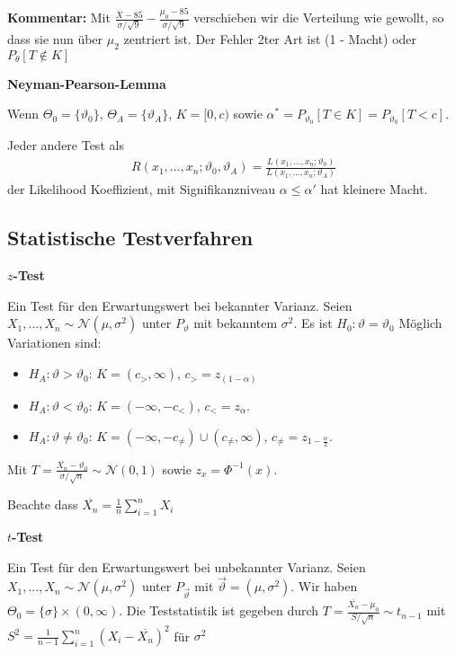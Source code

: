 \documentclass[25pt]{sciposter}
\newenvironment{method}[1]{\begin{mdframed}[backgroundcolor=blue!10,innertopmargin=15pt, innerbottommargin=15pt,nobreak=true]
		\textbf{#1 }
	}
	{ 
	\end{mdframed}
}
\newenvironment{thm}[1]{\begin{mdframed}[backgroundcolor=pink!20,innertopmargin=15pt, innerbottommargin=15pt, nobreak=true]
		\textbf{#1 }
	}
	{ 
	\end{mdframed}
}
\begin{document}
\begin{multicols}{3}
		\textbf{Kommentar: } Mit $\frac{\overline{X} -85}{\sigma / \sqrt{9}} - \frac{\mu_0  -85}{\sigma / \sqrt{9}}$ verschieben wir die Verteilung wie gewollt, so dass sie nun über $\mu_2$ zentriert ist. Der Fehler 2ter Art ist (1 - Macht) oder $P_\theta [T\not \in K]$
		
		\begin{thm}{Neyman-Pearson-Lemma}
			Wenn $\Theta_0 = \{\vartheta_0\}$, $\Theta_A = \{\vartheta_A\}$, $K = [0,c)$ sowie $\alpha^*= P_{\vartheta_0}[T\in K] = P_{\vartheta_0}[T < c]$.
			
			Jeder andere Test als 
			\begin{align*}
				R(x_1,\ldots,x_n;\vartheta_0, \vartheta_A) = \frac{L(x_1,\ldots,x_n;\vartheta_0)}{L(x_1,\ldots,x_n;\vartheta_A)}
			\end{align*}der Likelihood Koeffizient, mit Signifikanzniveau $\alpha \leq \alpha'$ hat kleinere Macht.
		\end{thm}
		
		
		\subsection*{Statistische Testverfahren}
		
		
		\begin{method}{$z$-Test}
			Ein Test für den Erwartungswert bei bekannter Varianz. Seien $X_1,\ldots,X_n\sim \mathcal{N}(\mu,\sigma^2)$ unter $P_{\vartheta}$ mit bekanntem $\sigma^2$. Es ist $H_0 : \vartheta = \vartheta_0$ Möglich Variationen sind:
			\begin{itemize}
				\item $H_A: \vartheta > \vartheta_0$: $K = (c_>,\infty)$, $c_> = z_{(1-\alpha)}$
				\item $H_A: \vartheta < \vartheta_0$: $K = (-\infty,-c_<)$, $c_< = z_\alpha$.
				\item $H_A: \vartheta \neq \vartheta_0$: $K = (-\infty,-c_{\neq}) \cup (c_{\neq},\infty)$, $c_{\neq} = z_{1-\frac{\alpha}{2}}$.
			\end{itemize}
			Mit $T=\frac{\overline{X_n}-\vartheta_0}{\sigma / \sqrt{n}} \sim \mathcal{N}(0,1)$ sowie $z_{x} = \Phi^{-1}(x)$.
		\end{method}
		Beachte dass $\overline{X_n} = \frac{1}{n} \sum_{i=1}^{n} X_i$
		
		\begin{method}{$t$-Test}
			Ein Test für den Erwartungswert bei unbekannter Varianz. Seien $X_1,\ldots,X_n\sim \mathcal{N}(\mu,\sigma^2)$ unter $P_{\vec{\vartheta}}$ mit $\vec{\vartheta}=(\mu,\sigma^2)$. Wir haben $\Theta_0= \{\sigma\}\times(0,\infty)$. Die Teststatistik ist gegeben durch $T = \frac{\overline{X_n}- \mu_0}{S/\sqrt{n}} \sim t_{n-1}$ mit $S^2=\frac{1}{n-1}\sum_{i=1}^{n}\left(X_i-\overline{X_n}\right)^2$ für $\sigma^2$
			

\end{method}
\end{multicols}
\end{document}
